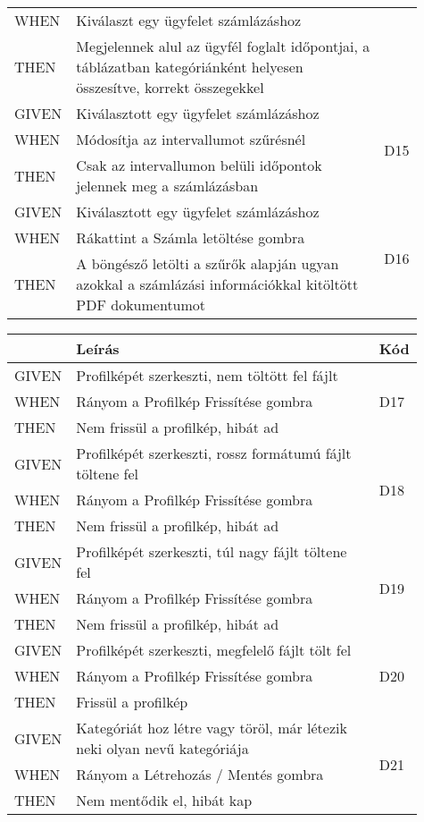 \begin{table}[H]
\begin{tabular}{|m{0.1\linewidth}|m{0.75\linewidth}|m{0.06\linewidth}|}
		WHEN  & Kiválaszt egy ügyfelet számlázáshoz & \\ \cline{1-2}
		THEN  & Megjelennek alul az ügyfél foglalt időpontjai, a táblázatban kategóriánként helyesen összesítve, korrekt összegekkel & \\ 
		\hline
		GIVEN & Kiválasztott egy ügyfelet számlázáshoz & \multirow{3}{*}{D15} \\ \cline{1-2}
		WHEN  & Módosítja az intervallumot szűrésnél & \\ \cline{1-2}
		THEN  & Csak az intervallumon belüli időpontok jelennek meg a számlázásban  & \\ 
		\hline
		GIVEN & Kiválasztott egy ügyfelet számlázáshoz & \multirow{3}{*}{D16} \\ \cline{1-2}
		WHEN  & Rákattint a Számla letöltése gombra & \\ \cline{1-2}
		THEN  & A böngésző letölti a szűrők alapján ugyan azokkal a számlázási információkkal kitöltött PDF dokumentumot  & \\ 
		\hline
	\end{tabular}
\end{table}

\begin{table}[H]
	\centering
	\begin{tabular}{|m{0.1\linewidth}|m{0.75\linewidth}|m{0.06\linewidth}|}
		\hline
		& \textbf{Leírás} & \textbf{Kód} \\
		\hline
		GIVEN & Profilképét szerkeszti, nem töltött fel fájlt & \multirow{3}{*}{D17} \\ \cline{1-2}
		WHEN  & Rányom a Profilkép Frissítése gombra & \\ \cline{1-2}
		THEN  & Nem frissül a profilkép, hibát ad & \\ 
		\hline
		GIVEN & Profilképét szerkeszti, rossz formátumú fájlt töltene fel & \multirow{3}{*}{D18} \\ \cline{1-2}
		WHEN  & Rányom a Profilkép Frissítése gombra & \\ \cline{1-2}
		THEN  & Nem frissül a profilkép, hibát ad & \\ 
		\hline
		GIVEN & Profilképét szerkeszti, túl nagy fájlt töltene fel & \multirow{3}{*}{D19} \\ \cline{1-2}
		WHEN  & Rányom a Profilkép Frissítése gombra & \\ \cline{1-2}
		THEN  & Nem frissül a profilkép, hibát ad & \\ 
		\hline
		GIVEN & Profilképét szerkeszti, megfelelő fájlt tölt fel & \multirow{3}{*}{D20} \\ \cline{1-2}
		WHEN  & Rányom a Profilkép Frissítése gombra & \\ \cline{1-2}
		THEN  & Frissül a profilkép & \\ 
		\hline
		GIVEN & Kategóriát hoz létre vagy töröl, már létezik neki olyan nevű kategóriája & \multirow{3}{*}{D21} \\ \cline{1-2}
		WHEN  & Rányom a Létrehozás / Mentés gombra & \\ \cline{1-2}
		THEN  & Nem mentődik el, hibát kap & \\ 
		\hline
	\end{tabular}
\end{table}
